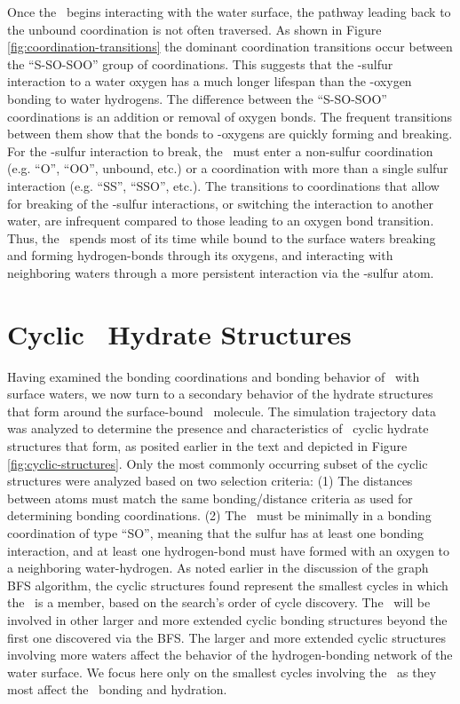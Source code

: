 \documentclass{article}
\begin{document}
Once the \suldiox~begins interacting with the water surface, the pathway leading back to the unbound coordination is not often traversed. As shown in Figure \ref{fig:coordination-transitions} the dominant coordination transitions occur between the ``S-SO-SOO'' group of coordinations. This suggests that the \suldiox-sulfur interaction to a water oxygen has a much longer lifespan than the \suldiox-oxygen bonding to water hydrogens. The difference between the ``S-SO-SOO'' coordinations is an addition or removal of oxygen bonds. The frequent transitions between them show that the bonds to \suldiox-oxygens are quickly forming and breaking. For the \suldiox-sulfur interaction to break, the \suldiox~must enter a non-sulfur coordination (e.g. ``O'', ``OO'', unbound, etc.) or a coordination with more than a single sulfur interaction (e.g. ``SS'', ``SSO'', etc.). The transitions to coordinations that allow for breaking of the \suldiox-sulfur interactions, or switching the interaction to another water, are infrequent compared to those leading to an oxygen bond transition. Thus, the \suldiox~spends most of its time while bound to the surface waters breaking and forming hydrogen-bonds through its oxygens, and interacting with neighboring waters through a more persistent interaction via the \suldiox-sulfur atom.



\section {Cyclic \suldiox~Hydrate Structures}

Having examined the bonding coordinations and bonding behavior of \suldiox~with surface waters, we now turn to a secondary behavior of the hydrate structures that form around the surface-bound \suldiox~molecule. The simulation trajectory data was analyzed to determine the presence and characteristics of \suldiox~cyclic hydrate structures that form, as posited earlier in the text and depicted in Figure \ref{fig:cyclic-structures}. Only the most commonly occurring subset of the cyclic structures were analyzed based on two selection criteria: (1) The distances between atoms must match the same bonding/distance criteria as used for determining bonding coordinations. (2) The \suldiox~must be minimally in a bonding coordination of type ``SO'', meaning that the sulfur has at least one bonding interaction, and at least one hydrogen-bond must have formed with an oxygen to a neighboring water-hydrogen. As noted earlier in the discussion of the graph BFS algorithm, the cyclic structures found represent the smallest cycles in which the \suldiox~is a member, based on the search's order of cycle discovery. The \suldiox~will be involved in other larger and more extended cyclic bonding structures beyond the first one discovered via the BFS. The larger and more extended cyclic structures involving more waters affect the behavior of the hydrogen-bonding network of the water surface. We focus here only on the smallest cycles involving the \suldiox~as they most affect the \suldiox~bonding and hydration.
\end{document}
